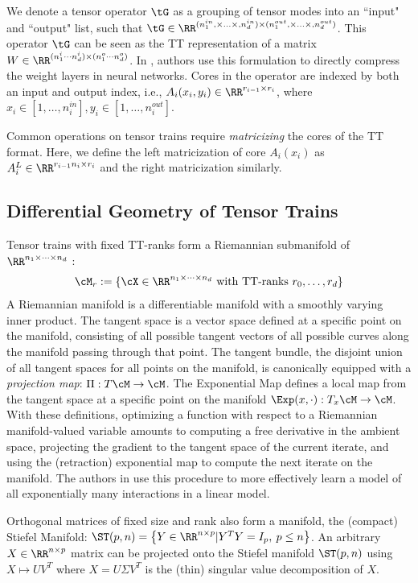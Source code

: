 We denote a tensor operator $\tG$ as a grouping of tensor modes into an ``input" and ``output" list, such that $\tG \in \RR^{(n_1^{in},\times\ldots\times,n_d^{in}) \times (n_1^{out},\times\ldots\times,n_d^{out})}$. This operator $\tG$ can be seen as the TT representation of a matrix $W \in \RR^{(n_1^i\cdots n_d^i) \times (n_1^o\cdots n_d^o)}$. In \cite{novikov2015tensorizing}, authors use this formulation to directly compress the weight layers in neural networks. Cores in the operator are indexed by both an input and output index, i.e., $A_i(x_i,y_i) \in \RR^{r_{i-1}\times r_i}$, where $x_i \in [1,\ldots,n_i^{in}], y_i \in [1,\ldots,n_i^{out}]$.

Common operations on tensor trains require \textit{matricizing} the cores of the TT format. Here, we define the left matricization of core $A_i(x_i)$ as $A_i^L \in \RR^{r_{i-1}n_i \times r_i} $ and the right matricization similarly.

\subsection{Differential Geometry of Tensor Trains}
Tensor trains with fixed TT-ranks form a Riemannian submanifold of $\RR^{n_1 \times \cdots \times n_d}$ \cite{lubich2015time, holtz2012manifolds}:
\begin{align}\label{eq:riem}
    \cM_r := \{ \cX \in \RR^{n_1 \times \cdots \times n_d} \text{ with TT-ranks } r_0,\ldots,r_d\} 
\end{align}
A Riemannian manifold is a differentiable manifold with a smoothly varying inner product. The tangent space is a vector space defined at a specific point on the manifold, consisting of all possible tangent vectors of all possible curves along the manifold passing through that point. The tangent bundle, the disjoint union of all tangent spaces for all points on the manifold, is canonically equipped with a \textit{projection map}: $\Pi: T\cM \rightarrow \cM$. The Exponential Map defines a local map from the tangent space at a specific point on the manifold $\Exp(x,\cdot): T_x\cM \rightarrow \cM$. With these definitions, optimizing a function with respect to a Riemannian manifold-valued variable amounts to computing a free derivative in the ambient space, projecting the gradient to the tangent space of the current iterate, and using the (retraction) exponential map to compute the next iterate on the manifold.
The authors in \cite{novikov2016exponential} use this procedure to more effectively learn a model of all exponentially many interactions in a linear model.

Orthogonal matrices of fixed size and rank also form a manifold, the (compact) Stiefel Manifold: $ \ST(p,n)=\left\{Y \in \RR^{n\times p} | Y^TY=I_p,\: p \leq n\right\}$.
An arbitrary $X \in \RR^{n \times p}$ matrix can be projected onto the Stiefel manifold $\ST(p,n)$ using $X \mapsto UV^T$ where $X=U\Sigma V^T$ is the (thin) singular value decomposition of $X$. 
